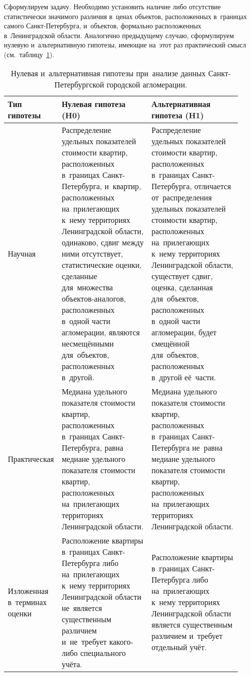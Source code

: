 \documentclass[]{scrreprt}
\begin{document}
Сформулируем задачу. Необходимо установить наличие либо отсутствие статистически значимого различия в~ценах объектов, расположенных в~границах самого Санкт-Петербурга, и~объектов, формально расположенных в~Ленинградской области. Аналогично предыдущему случаю, сформулируем нулевую и~альтернативную гипотезы, имеющие на~этот раз практический смысл (см.~таблицу~\ref{tab:nul-alt-hypothesis-SPba}).
\begin{table}[ht]
	\caption{Нулевая и~альтернативная гипотезы при~анализе данных Санкт-Петербургской городской агломерации.}  \label{tab:nul-alt-hypothesis-SPba}
	\centering
	\begin{tabularx}{\textwidth}{p{0.15\linewidth} p{0.4\linewidth} p{0.4\linewidth}} 
		\hline
		Тип гипотезы&Нулевая гипотеза (H0)&Альтернативная гипотеза (H1)\\
		\hline
		Научная&Распределение удельных показателей стоимости квартир, расположенных в~границах Санкт-Петербурга, и~квартир, расположенных на~прилегающих к~нему территориях Ленинградской области, одинаково, сдвиг между ними отсутствует, статистические оценки, сделанные для~множества объектов-аналогов, расположенных в~одной части агломерации, являются несмещёнными для~объектов, расположенных в~другой.&Распределение удельных показателей стоимости квартир, расположенных в~границах Санкт-Петербурга, отличается от~распределения удельных показателей стоимости квартир, расположенных на~прилегающих к~нему территориях Ленинградской области, существует сдвиг, оценка, сделанная для~объектов, расположенных в~одной части агломерации, будет смещённой для~объектов, расположенных в~другой её~части.\\
		\hline
		Практическая&Медиана удельного показателя стоимости квартир, расположенных в~границах Санкт-Петербурга, равна медиане удельного показателя стоимости квартир, расположенных на~прилегающих территориях Ленинградской области.&Медиана удельного показателя стоимости квартир, расположенных в~границах Санкт-Петербурга не~равна медиане удельного показателя стоимости квартир, расположенных на~прилегающих территориях Ленинградской области.\\
		\hline
		Изложенная в~терминах оценки&Расположение квартиры в~границах Санкт-Петербурга либо на~прилегающих к~нему территориях Ленинградской области не~является существенным различием и~не~требует какого-либо специального учёта.&Расположение квартиры в~границах Санкт-Петербурга либо на~прилегающих к~нему территориях Ленинградской области является существенным различием и~требует отдельный учёт.\\ \hline
	\end{tabularx}
\end{table}
\end{document}
